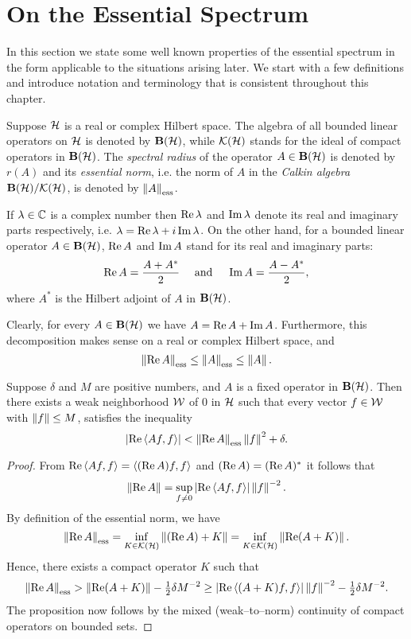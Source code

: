 \goodbreak
\section{On the Essential Spectrum}

In this section we state some well known properties of the essential spectrum
in the form applicable to the situations arising later. We start with a few
definitions and introduce notation and terminology that is consistent
throughout this chapter.

\begin{defn}
Suppose ${\cal H}$ is a real or complex Hilbert space. The algebra of all bounded
linear operators on ${\cal H}$ is denoted by $\mathbf B(\cal H)$, while $\cal K(\cal H)$ stands for the
ideal of compact operators in $\mathbf B(\cal H)$. The {\em spectral radius} of the
operator $A\in\mathbf B(\cal H)$ is denoted by $r(A)$ and its {\em essential norm}, i.e.
the norm of $A$ in the {\em Calkin algebra}\, $\mathbf B(\cal H)/\cal K(\cal H)$, is denoted by
$\essnorm{A}$.
\end{defn}

\begin{defn}
If $\lambda\in\mathbb C$ is a complex number then $\operatorname{Re}\lambda$ and
$\operatorname{Im}\lambda$ denote its real and imaginary parts respectively, i.e.
$\lambda=\operatorname{Re}\lambda+i\operatorname{Im}\lambda$. On the other hand, for a bounded linear
operator $A\in\mathbf B(\cal H)$, $\operatorname{Re}{A}$ and $\operatorname{Im}{A}$ stand for its real and imaginary
parts:
\[ \operatorname{Re}{A}=\frac{A+A^*}{2} \quad \text{ and } \quad
   \operatorname{Im}{A}=\frac{A-A^*}{2}, \]
where $A^*$ is the Hilbert adjoint of $A$ in $\mathbf B(\cal H)$.
\end{defn}

Clearly, for every $A\in\mathbf B(\cal H)$ we have $A=\operatorname{Re}{A}+\operatorname{Im}{A}$. Furthermore, this
decomposition makes sense on a real or complex Hilbert space, and
\begin{equation}\label{e:EssIE}
  \essnorm{\RE A} \leq \essnorm{A} \leq \norm{A}.
\end{equation}

\begin{prop} \label{p:EssNR}
Suppose $\delta$ and $M$ are positive numbers, and $A$ is a fixed operator in
$\mathbf B(\cal H)$. Then there exists a weak neighborhood ${\cal W}$ of $0$ in ${\cal H}$ such that
every vector $f\in{\cal W}$ with $\left\Vert f\right\Vert\leq{}M$, satisfies the inequality
\[ \abs{\RE\seq{A f,f}} < \essnorm{\RE{}A}\norm{f}^2 + \delta. \]
\end{prop}

\begin{proof}
From $\operatorname{Re}\left<A f,f\right>=\left<(\operatorname{Re}{A})f,f\right>$ and $(\operatorname{Re}{A})=(\operatorname{Re}{A})^*$ it follows
that
\[ \left\Vert\operatorname{Re}{}A\right\Vert = \sup_{f\neq0}
   \left\vert\operatorname{Re}\left<A f,f\right>\right\vert\left\Vert f\right\Vert^{-2}. \]
By definition of the essential norm, we have
\[ \essnorm{\RE A} = \inf_{K\in\KH} \norm{(\RE A)+K} =
   \inf_{K\in\KH} \norm{\RE(A+K)}. \]
Hence, there exists a compact operator $K$ such that
\[ \essnorm{\RE A} > \norm{\RE(A+K)}    - \tfrac{1}{2}\delta M^{-2} \geq
   \abs{\RE\seq{(A+K)f,f}}\norm{f}^{-2} - \tfrac{1}{2}\delta M^{-2} . \]
The proposition now follows by the mixed (weak--to--norm) continuity of
compact operators on bounded sets.
\end{proof}

